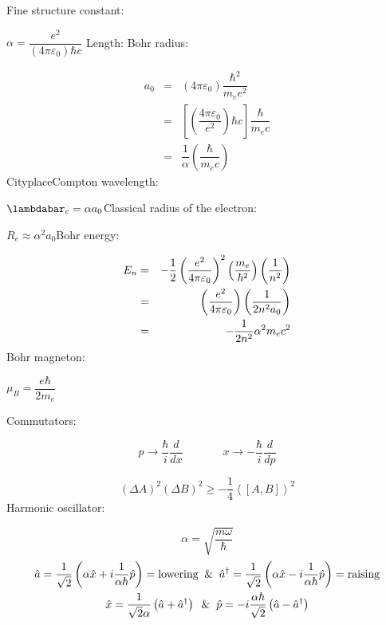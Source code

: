 \documentclass{article}
\begin{document}
Fine structure constant:

$\alpha =\dfrac{e^{2} }{\left( 4\pi \varepsilon _{0} \right) \hbar c} $%
Length:\newline
Bohr radius:

\begin{eqnarray*}
a_{0} & = & \left( 4\pi \varepsilon _{0} \right) \dfrac{\hbar ^{2} }{m_{e}
e^{2} } \\
& = & \left[ \left( \dfrac{4\pi \varepsilon _{0} }{e^{2} } \right) \hbar c%
\right] \dfrac{\hbar }{m_{e} c} \\
& = & \dfrac{1}{\alpha } \left( \dfrac{\hbar }{m_{e} c} \right)
\end{eqnarray*}
CityplaceCompton wavelength:

$\lambdabar _{c} =\alpha a_{0} $Classical radius of the electron:

$R_{e} \approx \alpha ^{2} a_{0} $Bohr energy:

\begin{eqnarray*}
E_{n} & = & -\dfrac{1}{2} \left( \dfrac{e^{2} }{4\pi \varepsilon _{0} }
\right) ^{2} \left( \dfrac{m_{e} }{\hbar ^{2} } \right) \left( \dfrac{1}{%
n^{2} } \right) \\
& = & \left( \dfrac{e^{2} }{4\pi \varepsilon _{0} } \right) \left( \dfrac{1}{%
2n^{2} a_{0} } \right) \\
& = & -\dfrac{1}{2n^{2} } \alpha ^{2} m_{e} c^{2}
\end{eqnarray*}
Bohr magneton:

$\mu _{B} =\dfrac{e\hbar }{2m_{e} } $

Commutators:


\begin{equation*}
p\rightarrow \frac{\hbar }{i} \frac{d}{dx} \qquad\quad\;\;x\rightarrow -%
\frac{\hbar }{i} \frac{d}{dp} 
\end{equation*}

\begin{equation*}
\left( \Delta A\right) ^{2} \left( \Delta B\right) ^{2} \geq -\frac{1}{4}
\left\langle \left[ A,B\right] \right\rangle ^{2} 
\end{equation*}%
\newpage Harmonic oscillator:

\begin{equation*}
\alpha =\sqrt{\frac{m\omega }{\hbar } } 
\end{equation*}
\begin{gather*}
\hat{a} =\dfrac{1}{\sqrt{2} } \left( \alpha \hat{x} +i\dfrac{1}{\alpha \hbar 
} \hat{p} \right) =\text{lowering} \;\;\&\;\;\hat{a} ^{\dag } =\dfrac{1}{%
\sqrt{2} } \left( \alpha \hat{x} -i\dfrac{1}{\alpha \hbar } \hat{p} \right) =%
\text{raising} \\
\hat{x} =\dfrac{1}{\sqrt{2} \alpha } \left( \hat{a} +\hat{a} ^{\dag }
\right) \;\;\&\;\;\hat{p} =-i\dfrac{\alpha \hbar }{\sqrt{2} } \left( \hat{a}
-\hat{a} ^{\dag } \right)
\end{gather*}
\end{document}

